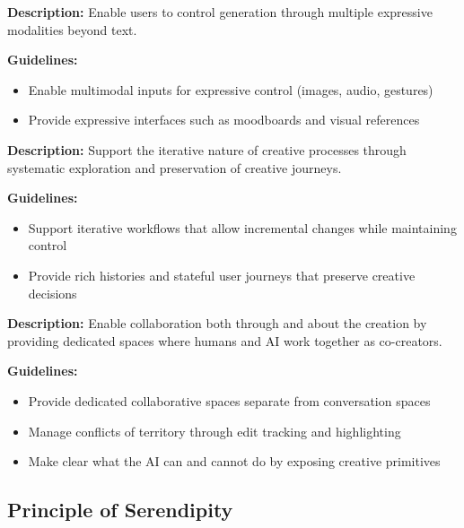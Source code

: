\begin{tcolorbox}[colback=red!5,colframe=red!75!black,title=\textbf{Principle 3: Expressiveness}]
\textbf{Description:} Enable users to control generation through multiple expressive modalities beyond text.

\textbf{Guidelines:}
\begin{itemize}
\item Enable multimodal inputs for expressive control (images, audio, gestures)
\item Provide expressive interfaces such as moodboards and visual references
\end{itemize}
\end{tcolorbox}

\begin{tcolorbox}[colback=green!5,colframe=green!75!black,title=\textbf{Principle 4: Iteration}]
\textbf{Description:} Support the iterative nature of creative processes through systematic exploration and preservation of creative journeys.

\textbf{Guidelines:}
\begin{itemize}
\item Support iterative workflows that allow incremental changes while maintaining control
\item Provide rich histories and stateful user journeys that preserve creative decisions
\end{itemize}
\end{tcolorbox}

\begin{tcolorbox}[colback=blue!5,colframe=blue!75!black,title=\textbf{Principle 5: Collaboration}]
\textbf{Description:} Enable collaboration both through and about the creation by providing dedicated spaces where humans and AI work together as co-creators.

\textbf{Guidelines:}
\begin{itemize}
\item Provide dedicated collaborative spaces separate from conversation spaces
\item Manage conflicts of territory through edit tracking and highlighting
\item Make clear what the AI can and cannot do by exposing creative primitives
\end{itemize}
\end{tcolorbox}


\subsection{Principle of Serendipity}

